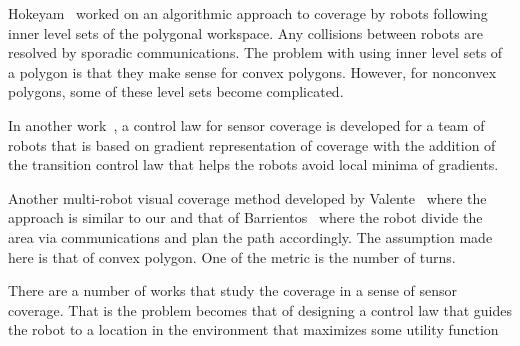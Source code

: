 \documentclass[../main.tex]{subfiles}
\begin{document}
Hokeyam~\cite{hokayem2007dynamic} worked on an algorithmic approach to coverage by robots following inner level sets of the polygonal workspace. Any collisions between robots are resolved by sporadic communications. The problem with using inner level sets of a polygon is that they make sense for convex polygons. However, for nonconvex polygons, some of these level sets become complicated. 

In another work~\cite{atincc2013supervised}, a control law for sensor coverage is developed for a team of robots that is based on gradient representation of coverage with the addition of the transition control law that helps the robots avoid local minima of gradients.

Another multi-robot visual coverage method developed by Valente~\cite{valente2011multi} where the approach is similar to our and that of Barrientos~\cite{barrientos2011aerial} where the robot divide the area via communications and plan the path accordingly. The assumption made here is that of convex polygon. One of the metric is the number of turns.

There are a number of works that study the coverage in a sense of sensor coverage. That is the problem becomes that of designing a control law that guides the robot to a location in the environment that maximizes some utility function


\end{document}

